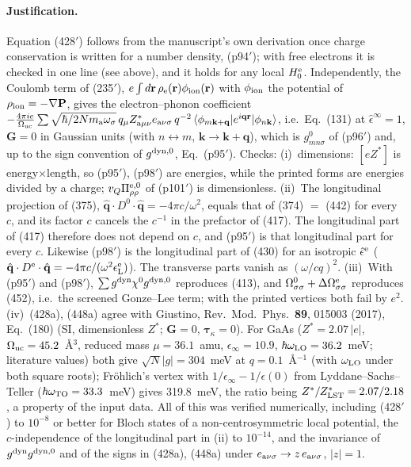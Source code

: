 \paragraph{Justification.}
Equation (428$'$) follows from the manuscript's own derivation once charge conservation is written for
a number density, (p94$'$); with free electrons it is checked in one line (see above), and it holds
for any local $H^{\rm e}_0$. Independently, the Coulomb term of (235$'$),
$e\int d\mathbf r\,\rho_{\rm e}(\mathbf r)\phi_{\rm ion}(\mathbf r)$ with $\phi_{\rm ion}$ the potential of
$\rho_{\rm ion}=-\nabla\mathbf P$, gives the electron--phonon coefficient
$-\frac{4\pi ie}{\Omega_{\rm uc}}\sum\sqrt{\hbar/2Nm_{\rm a}\omega_\sigma}\,q_\mu Z^*_{{\rm a}\mu\nu}e_{{\rm a}\nu\sigma}\,q^{-2}\,
\langle\phi_{m\mathbf k+\mathbf q}|e^{i\mathbf q\mathbf r}|\phi_{n\mathbf k}\rangle$, i.e.\ Eq.~(131) at
$\hat\epsilon^\infty=1$, $\mathbf G=0$ in Gaussian units (with $n\leftrightarrow m$, $\mathbf k\to\mathbf k+\mathbf q$),
which is $g^0_{mn\sigma}$ of (p96$'$) and,
up to the sign convention of $g^{\rm dyn,0}$, Eq.~(p95$'$). Checks: (i)~dimensions: $[eZ^*]$ is energy$\times$length, so (p95$'$),
(p98$'$) are energies, while the printed forms are energies divided by a charge; $v_Q\Pi^{\rm e,0}_{\rho\rho}$
of (p101$'$) is dimensionless. (ii)~The longitudinal projection of (375),
$\hat{\mathbf q}\cdot D^0\cdot\hat{\mathbf q}=-4\pi c/\omega^2$, equals that of (374) $=$ (442) for every $c$,
and its factor $c$ cancels the $c^{-1}$ in the prefactor of (417). The longitudinal part of (417) therefore
does not depend on $c$, and (p95$'$) is that longitudinal part for every $c$. Likewise (p98$'$) is the
longitudinal part of (430) for an isotropic $\hat\epsilon^{\rm e}$
($\hat{\mathbf q}\cdot D^{\rm e}\cdot\hat{\mathbf q}=-4\pi c/(\omega^2\epsilon^{\rm e}_{\rm L})$). The transverse
parts vanish as $(\omega/cq)^2$. (iii)~With (p95$'$) and (p98$'$),
$\sum g^{\rm dyn}\chi^0g^{\rm dyn,0}$ reproduces (413), and $\Omega^0_{\sigma\sigma}+\Delta\Omega^{\rm e}_{\sigma\sigma}$
reproduces (452), i.e.\ the screened Gonze--Lee term; with the printed vertices both fail by $e^2$.
(iv)~(428a), (448a) agree with Giustino, Rev.\ Mod.\ Phys.\ \textbf{89}, 015003 (2017), Eq.~(180)
(SI, dimensionless $Z^*$; $\mathbf G=0$, $\boldsymbol\tau_\kappa=0$). For GaAs ($Z^*=2.07\,|e|$,
$\Omega_{\rm uc}=45.2$~\AA$^3$, reduced mass $\mu=36.1$~amu, $\epsilon_\infty=10.9$, $\hbar\omega_{\rm LO}=36.2$~meV;
literature values) both give $\sqrt N|g|=304$~meV at $q=0.1$~\AA$^{-1}$ (with $\omega_{\rm LO}$ under
both square roots); Fr\"ohlich's vertex with
$1/\epsilon_\infty-1/\epsilon(0)$ from Lyddane--Sachs--Teller ($\hbar\omega_{\rm TO}=33.3$~meV) gives
319.8~meV, the ratio being $Z^*/Z^*_{\rm LST}=2.07/2.18$, a property of the input data. All of this was
verified numerically, including (428$'$) to $10^{-8}$ or better for Bloch states of a
non-centrosymmetric local potential, the $c$-independence of the longitudinal part in (ii) to $10^{-14}$,
and the invariance of $g^{\rm dyn}g^{\rm dyn,0}$ and of the signs in (428a), (448a) under
$e_{{\rm a}\nu\sigma}\to z\,e_{{\rm a}\nu\sigma}$, $|z|=1$.
